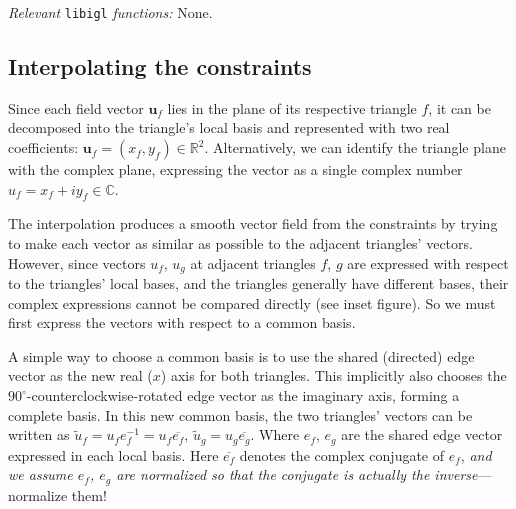 \documentclass[11pt]{amsart}
\renewcommand{\vec}[1]{\mathbf{#1}}
\newcommand{\setR}{\mathds{R}}
\newcommand{\setC}{\mathds{C}}
\renewcommand{\vec}[1]{\mathbf{#1}}
\begin{document}
\emph{Relevant} \texttt{libigl} \emph{functions: } None.
\vspace{-5mm}
\subsection{Interpolating the constraints}
Since each field vector $\vec u_f$ lies in the plane of its respective triangle
$f$, it can be decomposed into the triangle's local basis and represented with
two real coefficients: $\vec u_f = (x_f, y_f) \in \setR^2$. Alternatively, we can
identify the triangle plane with the complex plane, expressing the vector as a
single complex number $u_f = x_f + i y_f \in \setC$. 

The interpolation produces a smooth vector field from the constraints by trying
to make each vector as similar as possible to the adjacent triangles' vectors.
However, since vectors $u_f$, $u_g$ at adjacent triangles $f$, $g$
are expressed with respect to the triangles' local bases, and the
triangles generally have different bases,
their complex expressions cannot be compared directly (see inset figure). So we
must first express the vectors with respect to a common basis.

A simple way to choose a common basis is to use the shared (directed) edge
vector as the new real ($x$) axis for both triangles. This implicitly also chooses the
$90^\circ$-counterclockwise-rotated edge vector as the imaginary axis, forming
a complete basis. In this new common basis, the two triangles' vectors can be
written as $\tilde u_f = u_f e_f^{-1} = u_f \overline{e_f}$, $\tilde u_g = u_g
\overline{e_g}$. Where $e_f$, $e_g$ are the shared edge vector expressed in
each local basis. Here $\overline{e_f}$ denotes the complex conjugate of $e_f$,
\emph{and we assume $e_f$, $e_g$ are normalized so that the conjugate is
actually the inverse}---normalize them!
\end{document}

